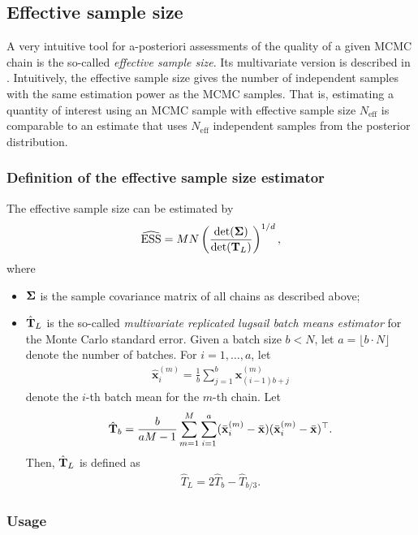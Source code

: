 \documentclass[10pt]{article}
\numberwithin{equation}{section}
\begin{document}
\subsection{Effective sample size}

A very intuitive tool for a-posteriori assessments of the quality of a given MCMC chain is the so-called \emph{effective sample size}. Its multivariate version is described in \cite{VatFleJon19}. Intuitively, the effective sample size gives the number of independent samples with the same estimation power as the MCMC samples. That is, estimating a quantity of interest using an MCMC sample with effective sample size $N_\text{eff}$ is comparable to an estimate that uses $N_\text{eff}$ independent samples from the posterior distribution.

\subsubsection*{Definition of the effective sample size estimator}

The effective sample size can be estimated by
\begin{align*}
\widehat {\mathrm{ESS}} = MN \left(\frac{\det(\mathbf{\Sigma})}{\det(\mathbf{T}_L)} \right)^{1/d},
\end{align*}
where
\begin{itemize}
\item $\mathbf{\Sigma}$ is the sample covariance matrix of all chains as described above;
\item $\hat{\mathbf{T}}_L$ is the so-called \emph{multivariate replicated lugsail batch means estimator} for the Monte Carlo standard error. Given a batch size $b < N$, let $a = \lfloor b \cdot N \rfloor$ denote the number of batches. For $i = 1,\ldots, a$, let
\begin{align*}
\hat{\bm x}_i^{(m)} = \frac{1}{b} \sum_{j=1}^b \bm x_{(i-1)b + j}^{(m)}
\end{align*}
denote the $i$-th batch mean for the $m$-th chain. Let
\begin{align*}
\hat{\mathbf{T}}_b = \frac{b}{aM - 1} \sum_{m=1}^M \sum_{i=1}^a (\bar{\mathbf{x}}_i^{(m)} - \bar{\mathbf{x}})(\bar{\mathbf{x}}_i^{(m)} - \bar{\mathbf{x}})^\top.
\end{align*}
Then, $\hat{\mathbf{T}}_L$ is defined as
\begin{align*}
\hat T_L = 2 \hat T_b - \hat T_{b/3}.
\end{align*}
\end{itemize}

\subsubsection*{Usage}
\end{document}
